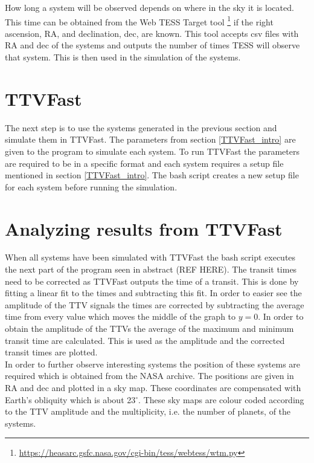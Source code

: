 \documentclass[12pt]{report}
\begin{document}
	How long a system will be observed depends on where in the sky it is located. This time can be obtained from the Web TESS Target tool \footnote{\url{https://heasarc.gsfc.nasa.gov/cgi-bin/tess/webtess/wtm.py}} if the right ascension, RA, and declination, dec, are known. This tool accepts csv files with RA and dec of the systems and outputs the number of times TESS will observe that system. This is then used in the simulation of the systems.
	

\section{TTVFast}
\label{TTVFast_method}
	The next step is to use the systems generated in the previous section and simulate them in TTVFast. The parameters from section \ref{TTVFast_intro} are given to the program to simulate each system. To run TTVFast the parameters are required to be in a specific format and each system requires a setup file mentioned in section \ref{TTVFast_intro}. The bash script creates a new setup file for each system before running the simulation. 

\section{Analyzing results from TTVFast}
	When all systems have been simulated with TTVFast the bash script executes the next part of the program seen in abstract (REF HERE). The transit times need to be corrected as TTVFast outputs the time of a transit. This is done by fitting a linear fit to the times and subtracting this fit. In order to easier see the amplitude of the TTV signals the times are corrected by subtracting the average time from every value which moves the middle of the graph to $y=0$. In order to obtain the amplitude of the TTVs the average of the maximum and minimum transit time are calculated. This is used as the amplitude and the corrected transit times are plotted. \\
	
	In order to further observe interesting systems the position of these systems are required which is obtained from the NASA archive. The positions are given in RA and dec and plotted in a sky map. These coordinates are compensated with Earth's obliquity which is about 23$^{\circ}$. These sky maps are colour coded according to the TTV amplitude and the multiplicity, i.e. the number of planets, of the systems.
\end{document}
